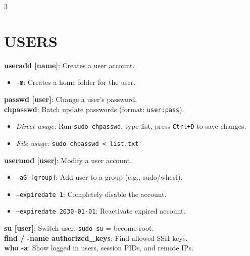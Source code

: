\documentclass[7pt,landscape]{article}
\begin{document}
\begin{multicols*}{3}
\section{USERS}
\textbf{useradd [name]}: Creates a user account.
\begin{itemize}
    \item \texttt{-m}: Creates a home folder for the user.
\end{itemize}
\textbf{passwd [user]}: Change a user’s password. \\
\textbf{chpasswd}: Batch update passwords (format: \texttt{user:pass}).
\begin{itemize}
    \item \textit{Direct usage:} Run \texttt{sudo chpasswd}, type list, press \texttt{Ctrl+D} to save changes.
    \item \textit{File usage:} \texttt{sudo chpasswd < list.txt}
\end{itemize}
\textbf{usermod [user]}: Modify a user account.
\begin{itemize}
    \item \texttt{-aG [group]}: Add user to a group (e.g., sudo/wheel).
    \item \texttt{--expiredate 1}: Completely disable the account.
    \item \texttt{--expiredate 2030-01-01}: Reactivate expired account.
\end{itemize}
\textbf{su [user]}: Switch user. \texttt{sudo su} = become root. \\
\textbf{find / -name authorized\_keys}: Find allowed SSH keys. \\
\textbf{who -a}: Show logged in users, session PIDs, and remote IPs.


\end{multicols*}
\end{document}
